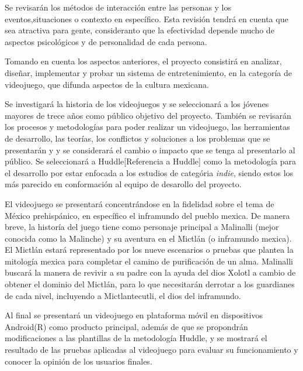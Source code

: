 Se revisarán los métodos de interacción entre las personas y los eventos,situaciones o contexto en específico. 
Esta revisión tendrá en cuenta que sea atractiva para gente, consideranto que la efectividad depende mucho 
de aspectos psicológicos y de personalidad de cada persona.

Tomando en cuenta los aspectos anteriores, el proyecto consistirá en %
analizar, diseñar, implementar y probar un sistema de entretenimiento, en la categoría de videojuego, 
que %
difunda aspectos de la cultura mexicana.

Se investigará la historia de los videojuegos y se seleccionará a los jóvenes mayores de trece años como público 
objetivo del proyecto. También se revisarán los procesos y metodologías para poder realizar un videojuego, 
las herramientas de desarrollo, las teorías, los conflictos y soluciones a los problemas que se presentarán y
y se considerará el cambio o impacto que se tenga al presentarlo al público. Se seleccionará a Huddle[Referencia a Huddle]
como la metodología para el desarrollo por estar enfocada a los estudios de categória {\it indie}, siendo
estos los más parecido en conformación al equipo de desarollo del proyecto.

El videojuego se presentará concentrándose en la fidelidad sobre el tema de México prehispánico, 
en específico el inframundo del pueblo mexica. De manera breve, la historía del juego tiene como personaje principal a 
Malinalli (mejor conocida como la Malinche) y su aventura en el Mictlán (o inframundo mexica). 
El Mictlán estará representado por los nueve escenarios o pruebas que plantea la mitología mexica para completar 
el camino de purificación de un alma. Malinalli buscará la manera de revivir a su padre con la ayuda del dios Xolotl 
a cambio de obtener el dominio del Mictlán, para lo que necesitarán derrotar a los guardianes de cada nivel, incluyendo 
a Mictlantecutli, el dios del inframundo.

Al final se presentará un videojuego en plataforma móvil en dispositivos Android(R) como producto principal, 
además de que se propondrán modificaciones a las plantillas de la metodología Huddle, y se mostrará el 
resultado de las pruebas aplicadas al videojuego para evaluar su funcionamiento y conocer la opinión de los 
usuarios finales.
